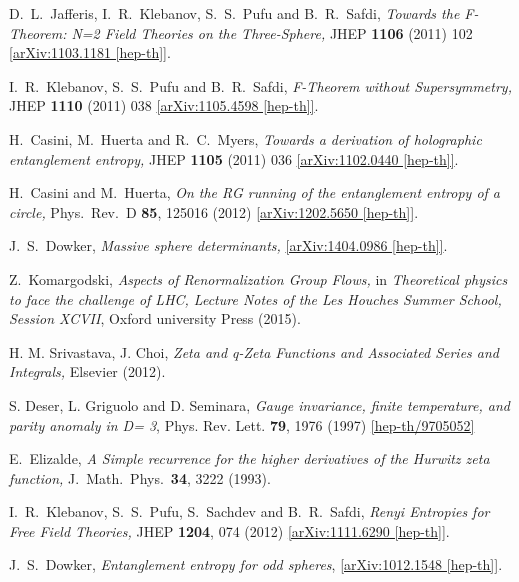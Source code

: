 \documentclass[12pt,a4paper]{article}
\numberwithin{equation}{section}
\begin{document}
\begin{thebibliography}{99}
D.~L.~Jafferis, I.~R.~Klebanov, S.~S.~Pufu and B.~R.~Safdi,
\textit{Towards the F-Theorem: N=2 Field Theories on the Three-Sphere,}
JHEP {\bf 1106} (2011) 102
\href{http://arxiv.org/abs/arXiv:1103.1181}{[arXiv:1103.1181 [hep-th]]}.

I.~R.~Klebanov, S.~S.~Pufu and B.~R.~Safdi,
\textit{F-Theorem without Supersymmetry,}
JHEP {\bf 1110} (2011) 038
\href{http://arxiv.org/abs/arXiv:1105.4598}{[arXiv:1105.4598 [hep-th]]}.

H.~Casini, M.~Huerta and R.~C.~Myers,
\textit{Towards a derivation of holographic entanglement entropy,}
JHEP {\bf 1105} (2011) 036
\href{http://arxiv.org/abs/arXiv:1102.0440}{[arXiv:1102.0440 [hep-th]]}.

H.~Casini and M.~Huerta,
\textit{On the RG running of the entanglement entropy of a circle,}
Phys.\ Rev.\ D {\bf 85}, 125016 (2012)
\href{http://arxiv.org/abs/arXiv:1202.5650}{[arXiv:1202.5650 [hep-th]]}.

J.~S.~Dowker,
\textit{Massive sphere determinants,}
\href{http://arxiv.org/abs/arXiv:1404.0986}{[arXiv:1404.0986 [hep-th]]}.

Z.~Komargodski,
\textit{Aspects of Renormalization Group Flows,}
in \textit{Theoretical physics to face the challenge of LHC, Lecture Notes of the Les Houches Summer School, Session XCVII}, Oxford university Press (2015).

H. M. Srivastava, J. Choi,
\textit{Zeta and q-Zeta Functions and Associated Series and Integrals,}
Elsevier (2012).

S. Deser, L. Griguolo and D. Seminara,
\textit{Gauge invariance, finite temperature, and parity anomaly in D= 3},
Phys. Rev. Lett. {\bf 79}, 1976 (1997)
\href{http://arxiv.org/abs/hep-th/9705052}{[hep-th/9705052]}

E.~Elizalde,
\textit{A Simple recurrence for the higher derivatives of the Hurwitz zeta function,}
J.\ Math.\ Phys.\  {\bf 34}, 3222 (1993).

I.~R.~Klebanov, S.~S.~Pufu, S.~Sachdev and B.~R.~Safdi,
\textit{Renyi Entropies for Free Field Theories,}
JHEP {\bf 1204}, 074 (2012)
\href{http://arxiv.org/abs/arXiv:1111.6290}{[arXiv:1111.6290 [hep-th]]}.

J.~S.~Dowker,
\textit{Entanglement entropy for odd spheres},
\href{http://arxiv.org/abs/arXiv:1012.1548}{[arXiv:1012.1548 [hep-th]]}.


\end{thebibliography}
\end{document}
